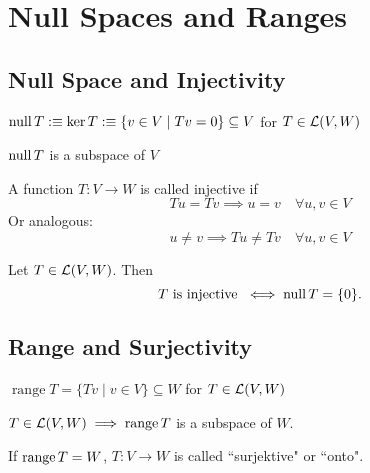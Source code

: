 \section{Null Spaces and Ranges}

\subsection{Null Space and Injectivity}

\begin{mydef}
  $\operatorname{null} T :\equiv \ker T :\equiv \{ v \in V \mid Tv=0\} \subseteq V$ for $T \in {\mathcal{L}(V,W)}$
\end{mydef}

\setcounter{thm}{12}
\begin{thm}
  $\operatorname{null} T$ is a subspace of $V$
\end{thm}

\setcounter{thm}{13}
\begin{mydef}
  A function $T: V \to W$ is called injective if
  \begin{equation}
    Tu = Tv \implies u = v \quad \forall u,v \in V
  \end{equation}
  Or analogous:
  \begin{equation}
    u \neq v \implies Tu \neq Tv \quad \forall u,v \in V
  \end{equation}
\end{mydef}

\setcounter{thm}{14}
\begin{mydef}
  Let $T \in {\mathcal{L}(V,W)}$. Then
  \begin{equation}
    T \text{ is injective } \iff \operatorname{null} T = \{0 \}.
  \end{equation}
\end{mydef}

\subsection{Range and Surjectivity}
\setcounter{thm}{15}
\begin{mydef}
  $\operatorname{range}T= \{Tv \mid v \in V\} \subseteq W$ for $T \in {\mathcal{L}(V,W)}$
\end{mydef}

\setcounter{thm}{17}
\begin{thm}
  $T\in {\mathcal{L}(V,W)} \implies \operatorname{range} T$ is a subspace of $W$.
\end{thm}

\setcounter{thm}{18}
\begin{mydef}
  If $\operatorname{range} T=W$, $T:V\to W$ is called ``surjektive" or ``onto".
\end{mydef}

